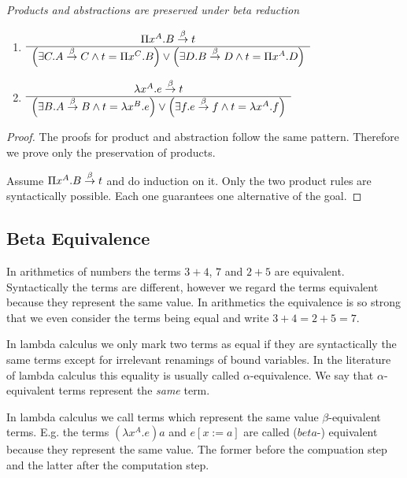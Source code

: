 \begin{lemma}
    \label{ReductionProductAbstraction}
    \emph{Products and abstractions are preserved under beta reduction}
    \begin{enumerate}
    \item
    $
        \begin{array}{c} 
            \Pi x^A.B \stackrel{\beta}{\to} t
         \\ \hline 
            \left( \exists C. A \stackrel{\beta}{\to} C \land t = \Pi x^C. B \right)
            \lor
            \left( \exists D. B \stackrel{\beta}{\to} D \land t = \Pi x^A. D \right)
        \end{array}
    $
    \item
    $
        \begin{array}{c} 
            \lambda x^A.e \stackrel{\beta}{\to} t
         \\ \hline 
            \left( \exists B. A \stackrel{\beta}{\to} B \land t = \lambda x^B. e \right)
            \lor
            \left( \exists f. e \stackrel{\beta}{\to} f \land t = \lambda x^A. f \right)
        \end{array}
    $
    \end{enumerate}

    \begin{proof}
        The proofs for product and abstraction follow the same pattern.
        Therefore we prove only the preservation of products.

        Assume $\Pi x^A. B \stackrel{\beta}{\to} t$ and do induction on it. Only the two
        product rules are syntactically possible. Each one guarantees one
        alternative of the goal.
    \end{proof}
\end{lemma}



\subsection{Beta Equivalence}

In arithmetics of numbers the terms $3 + 4$, $7$ and $2 + 5$ are equivalent.
Syntactically the terms are different, however we regard the terms equivalent
because they represent the same value. In arithmetics the equivalence is so
strong that we even consider the terms being equal and write $3 + 4 = 2 + 5 = 7$.

In lambda calculus we only mark two terms as equal if they are syntactically the
same terms except for irrelevant renamings of bound variables. In the literature
of lambda calculus this equality is usually called $\alpha$-equivalence. We say
that $\alpha$-equivalent terms represent the \emph{same} term.

In lambda calculus we call terms which represent the same value
$\beta$-equivalent terms. E.g. the terms $(\lambda x^A.e) a$ and $e[x:=a]$ are
called ($beta$-) equivalent because they represent the same value. The former
before the compuation step and the latter after the computation step.

